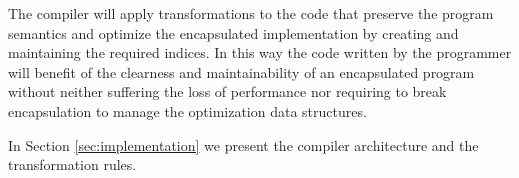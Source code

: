 The compiler will apply transformations to the code that preserve the program semantics and optimize the encapsulated implementation by creating and maintaining the required indices. In this way the code written by the programmer will benefit of the clearness and maintainability of an encapsulated program without neither suffering the loss of performance nor requiring to break encapsulation to manage the optimization data structures.

In Section \ref{sec:implementation} we present the compiler architecture and the transformation rules.